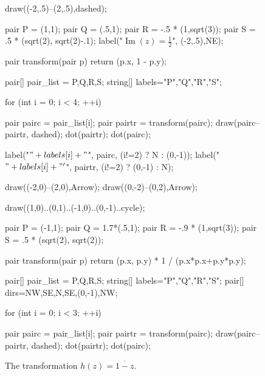 \documentclass[../textbook.tex]{subfiles}
\begin{document}
\begin{figure}[h]
\begin{center}
\begin{minipage}[b]{0.45\textwidth}
\begin{center}
\begin{minipage}[b]{\textwidth}
\begin{asy}[width=0.7\textwidth]
						draw((-2,.5)--(2,.5),dashed);

						pair P = (1,1);
						pair Q = (.5,1);
						pair R = -.5 * (1,sqrt(3));
						pair S = .5 * (sqrt(2), sqrt(2)-.1);
						label("$\operatorname{Im}(z)=\frac{1}{2}$", (-2,.5),NE);

						pair transform(pair p) {
							return (p.x, 1 - p.y);
						}

						pair[] pair_list = {P,Q,R,S};
						string[] labels={"P","Q","R","S"};

						for (int i = 0; i < 4; ++i) {
							pair pairc = pair_list[i];
							pair pairtr = transform(pairc);
							draw(pairc--pairtr, dashed);
							dot(pairtr);
							dot(pairc);

							label("$" + labels[i] + "$", pairc, (i!=2) ? N : (0,-1));
							label("$" + labels[i] + "'$", pairtr, (i!=2) ? (0,-1) : N);
						}
					\end{asy}
				\end{minipage}
			\end{center}
			\vspace*{-2\baselineskip}
			\begin{center}
				\begin{minipage}[t]{\textwidth}
					\caption{The transformation $h(z)=\overline{1-z}$.}
					\label{fig:function_h}
				\end{minipage}
			\end{center}

			\begin{center}
				\begin{minipage}[b]{\textwidth}
					\centering
					\begin{asy}[width=0.7\textwidth]
						draw((-2,0)--(2,0),Arrow);
						draw((0,-2)--(0,2),Arrow);

						draw((1,0)..(0,1)..(-1,0)..(0,-1)..cycle);

						pair P = (-1,1);
						pair Q = 1.7*(.5,1);
						pair R = -.9 * (1,sqrt(3));
						pair S = .5 * (sqrt(2), sqrt(2));

						pair transform(pair p) {
							return (p.x, p.y) * 1 / (p.x*p.x+p.y*p.y);
						}

						pair[] pair_list = {P,Q,R,S};
						string[] labels={"P","Q","R","S"};
						pair[] dirs={NW,SE,N,SE,(0,-1),NW};

						for (int i = 0; i < 3; ++i) {
							pair pairc = pair_list[i];
							pair pairtr = transform(pairc);
							draw(pairc--pairtr, dashed);
							dot(pairtr);
							dot(pairc);

}
\end{asy}
\end{minipage}
\end{center}
\end{minipage}
\end{center}
\end{figure}
\end{document}
